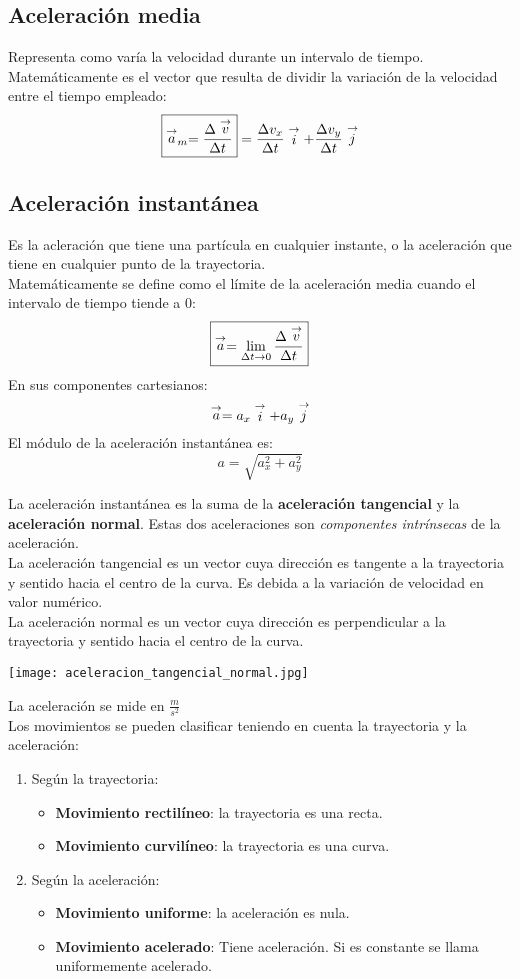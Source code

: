 \subsection{Aceleración media}
Representa como varía la velocidad durante un intervalo de tiempo.\\
Matemáticamente es el vector que resulta de dividir la variación de la velocidad entre el tiempo empleado:
$$\boxed{\stackrel{\to}{a}_m = \frac{\Delta \stackrel{\to}{v}}{\Delta t}} = \frac{\Delta v_x}{\Delta t}\stackrel{\to}{i} + \frac{\Delta v_y}{\Delta t}\stackrel{\to}{j}$$

\subsection{Aceleración instantánea}
Es la acleración que tiene una partícula en cualquier instante, o la aceleración que tiene en cualquier punto de la trayectoria.\\
Matemáticamente se define como el límite de la aceleración media cuando el intervalo de tiempo tiende a 0:
$$\boxed{\stackrel{\to}{a} = \lim_{\Delta t \to 0} \frac{\Delta \stackrel{\to}{v}}{\Delta t}}$$
En sus componentes cartesianos:
$$\stackrel{\to}{a} = a_x \stackrel{\to}{i} + a_y \stackrel{\to}{j}$$
El módulo de la aceleración instantánea es:
$$a = \sqrt{a^2_x + a^2_y}$$

La aceleración instantánea es la suma de la \textbf{aceleración tangencial} y la \textbf{aceleración normal}. Estas dos aceleraciones son \emph{componentes intrínsecas} de la aceleración.\\
La aceleración tangencial es un vector cuya dirección es tangente a la trayectoria y sentido hacia el centro de la curva. Es debida a la variación de velocidad en valor numérico.\\
La aceleración normal es un vector cuya dirección es perpendicular a la trayectoria y sentido hacia el centro de la curva.
\begin{center}
    \texttt{[image: aceleracion\_tangencial\_normal.jpg]}
\end{center}
La aceleración se mide en $\frac{m}{s^2}$\\
Los movimientos se pueden clasificar teniendo en cuenta la trayectoria y la aceleración:
\begin{enumerate}
    \item Según la trayectoria:
    \begin{itemize}
        \item \textbf{Movimiento rectilíneo}: la trayectoria es una recta.
        \item \textbf{Movimiento curvilíneo}: la trayectoria es una curva.
    \end{itemize}
    \item Según la aceleración:
    \begin{itemize}
        \item \textbf{Movimiento uniforme}: la aceleración es nula.
        \item \textbf{Movimiento acelerado}: Tiene aceleración. Si es constante se llama uniformemente acelerado.
    \end{itemize}
\end{enumerate}

